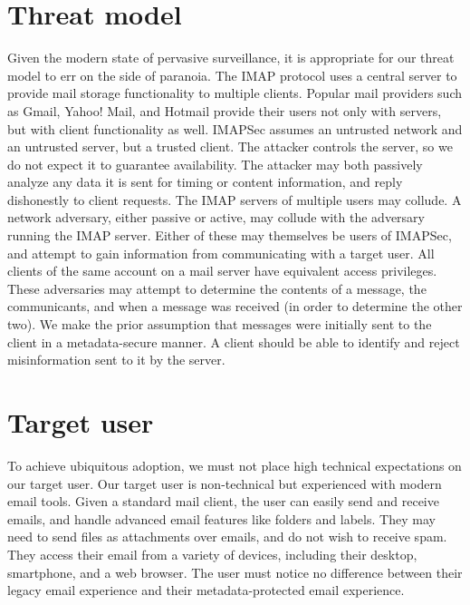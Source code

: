 \documentclass[pageno]{jpaper}
\newcommand{\project}{IMAPSec }
\newcommand{\projectnospace}{IMAPSec}
\begin{document}
\section{Threat model}

Given the modern state of pervasive surveillance, it is appropriate for our threat model to err on the side of paranoia. The IMAP protocol uses a central server to provide mail storage functionality to multiple clients. Popular mail providers such as Gmail, Yahoo! Mail, and Hotmail provide their users not only with servers, but with client functionality as well. \project assumes an untrusted network and an untrusted server, but a trusted client. The attacker controls the server, so we do not expect it to guarantee availability. The attacker may both passively analyze any data it is sent for timing or content information, and reply dishonestly to client requests. The IMAP servers of multiple users may collude. A network adversary, either passive or active, may collude with the adversary running the IMAP server. Either of these may themselves be users of \projectnospace, and attempt to gain information from communicating with a target user. All clients of the same account on a mail server have equivalent access privileges. These adversaries may attempt to determine the contents of a message, the communicants, and when a message was received (in order to determine the other two). We make the prior assumption that messages were initially sent to the client in a metadata-secure manner. A client should be able to identify and reject misinformation sent to it by the server.


\section{Target user}
\label{targetuser}

To achieve ubiquitous adoption, we must not place high technical expectations on our target user. Our target user is non-technical but experienced with modern email tools. Given a standard mail client, the user can easily send and receive emails, and handle advanced email features like folders and labels. They may need to send files as attachments over emails, and do not wish to receive spam. They access their email from a variety of devices, including their desktop, smartphone, and a web browser. The user must notice no difference between their legacy email experience and their metadata-protected email experience.
\end{document}
